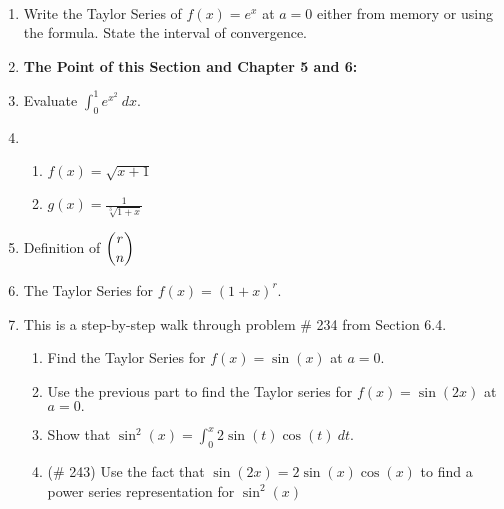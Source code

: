 \documentclass[11pt]{amsart}
\newcommand{\ds}{\displaystyle}
\begin{document}
\begin{center}
  \large
  \\
   
\end{center}

\begin{enumerate}
\item Write the Taylor Series of $f(x)=e^x$ at $a=0$ either from memory or using the formula. State the interval of convergence.
\vfill

\item \textbf{The Point of this Section and Chapter 5 and 6:}

\vspace{1in}

\item Evaluate $\ds \int_0^1 e^{x^2} \: dx.$

\vspace{6in}

\newpage

\item 
	\begin{enumerate}
	\item $\ds f(x)=\sqrt{x+1}$
	\vfill
	\item $\ds g(x)=\frac{1}{\sqrt[3]{1+x}}$
	\vfill
	\end{enumerate}

\item Definition of $\large{\ds {r \choose n}}$
\vfill
\newpage
\item The Taylor Series for $\ds f(x)=(1+x)^r.$
\vspace{1in}

\item This is a step-by-step walk through problem \# 234 from Section 6.4.
	\begin{enumerate}
	\item Find the Taylor Series for $f(x)=\sin(x)$ at $a=0.$
	\vfill
	\newpage
	\item Use the previous part to find the Taylor series for $f(x)=\sin(2x)$ at $a=0.$
	\vspace{2in}
	\item Show that $\ds \sin^2(x)=\int_0^x 2\sin(t)\cos(t) \: dt.$
	\vspace{2in}
	\item (\# 243) Use the fact that $\sin(2x)=2\sin(x)\cos(x)$ to find a power series representation for $\sin^2(x)$
	\vfill
	\end{enumerate}

\end{enumerate}
\end{document}
